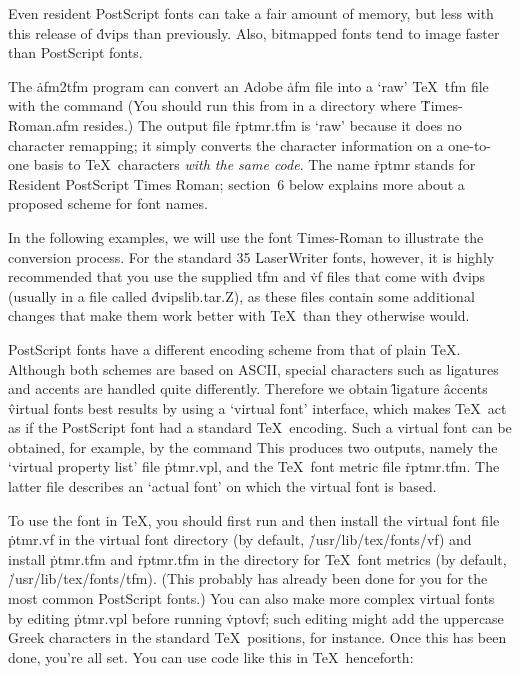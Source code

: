 Even resident PostScript fonts can take a fair amount of memory,
but less with this release of \.{dvips} than previously.  Also,
bitmapped fonts tend to image faster than PostScript fonts.


The \.{afm2tfm} program can convert an Adobe \.{afm} file into a `raw'
\TeX\ \.{tfm} file with the command
\noindent
(You should run this from in a directory where \.{Times-Roman.afm} resides.)
The output file \.{rptmr.tfm} is `raw' because it does no character remapping;
it simply converts the character information on a one-to-one basis to \TeX\
characters {\it with the same code}. The name \.{rptmr} stands for
Resident PostScript Times Roman; section~6 below explains more about
a proposed scheme for font names.

In the following examples, we will use the font Times-Roman to
illustrate the conversion process.  For the standard 35 LaserWriter
fonts, however, it is highly recommended that you use the supplied
\.{tfm} and \.{vf} files that come with \.{dvips} (usually in a
file called \.{dvipslib.tar.Z}), as these files contain some additional
changes that make them work better with \TeX\ than they otherwise
would.

PostScript fonts have a different encoding scheme from that of plain
\TeX. Although both schemes are based on ASCII, special characters such as
ligatures and accents are handled quite differently. Therefore we obtain
\^{ligature}
\^{accents}
\^{virtual fonts}
best results by using a `virtual font' interface, which makes \TeX\ act
as if the PostScript font had a standard \TeX\ encoding. Such a virtual
font can be obtained, for example, by the command
\noindent
This produces two outputs, namely the `virtual property list' file
\.{ptmr.vpl}, and the \TeX\ font metric file \.{rptmr.tfm}.
The latter file describes an `actual font' on which the virtual font is based.

To use the font in \TeX, you should first run
\noindent
and then install the virtual font file \.{ptmr.vf} in the virtual font
directory (by default, \.{/usr/lib/tex/fonts/vf}) and install \.{ptmr.tfm}
and \.{rptmr.tfm} in the directory for \TeX\ font metrics (by default,
\.{/usr/lib/tex/fonts/tfm}).  (This probably has already been done for you for
the most common PostScript fonts.)
You can also make more complex virtual fonts by editing
\.{ptmr.vpl} before running \.{vptovf}; such editing might add the uppercase
Greek characters in the standard \TeX\ positions, for instance.
Once this has been done, you're all set. You can use
code like this in \TeX\ henceforth:

